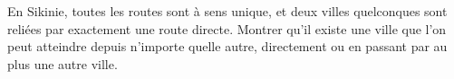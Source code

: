 En Sikinie, toutes les routes sont à sens unique, et deux villes quelconques sont reliées par exactement une route directe. Montrer qu'il existe une ville que l'on peut atteindre depuis n'importe quelle autre, directement ou en passant par au plus une autre ville.
